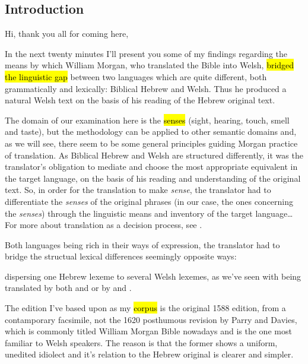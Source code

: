 \begin{paper}
	\setcounter{section}{-1}
	\section{Introduction}

	{\click} Hi, thank you all for coming here,

	{\click} In the next twenty minutes I’ll present you some of my findings regarding the means by which William Morgan, who translated the Bible into Welsh, \hl{bridged the linguistic gap} between two languages which are quite different, both grammatically and lexically: Biblical Hebrew and Welsh. Thus he produced a natural Welsh text on the basis of his reading of the Hebrew original text.

	The domain of our examination here is the \hl{senses} (sight, hearing, touch, smell and taste), but the methodology can be applied to other semantic domains and, as we will see, there seem to be some general principles guiding Morgan practice of translation. As Biblical Hebrew and Welsh are structured differently, it was the translator’s obligation to mediate and choose the most appropriate equivalent in the target language, on the basis of his reading and understanding of the original text. So, in order for the translation to make \emph{sense}, the translator had to differentiate the \emph{senses} of the original phrases (in our case, the ones concerning the \emph{senses}) through the linguistic means and inventory of the target language… For more about translation as a decision process, see \cite{levy.j:1967:translation}.

	Both languages being rich in their ways of expression, the translator had to bridge the structual lexical differences seemingly opposite ways:
	\begin{compactitem}
	\item dispersing one Hebrew lexeme to several Welsh lexemes, as we’ve seen with  being translated by both  and  or  by  and .\tounfold{***}
	\end{compactitem}


	{\click} The edition I’ve based upon as my \hl{corpus} is the original 1588 edition, from a contamporary facsimile, not the 1620 posthumous revision by Parry and Davies, which is commonly titled William Morgan Bible nowadays and is the one most familiar to Welsh speakers. The reason is that the former shows a uniform, unedited idiolect and it’s relation to the Hebrew original is clearer and simpler.


\end{paper}
